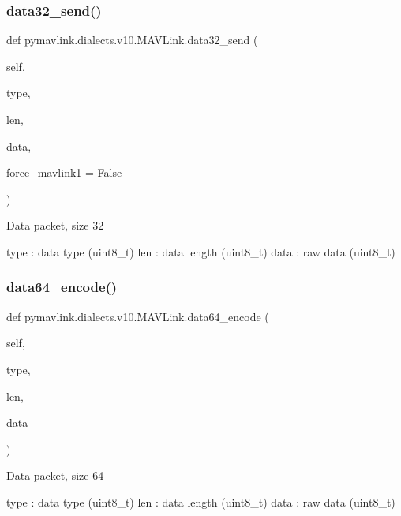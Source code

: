\begin{DoxyVerb}
\begin{DoxyVerb}
\subsubsection{\texorpdfstring{data32\+\_\+send()}{data32\_send()}}
{\footnotesize\ttfamily def pymavlink.\+dialects.\+v10.\+M\+A\+V\+Link.\+data32\+\_\+send (\begin{DoxyParamCaption}\item[{}]{self,  }\item[{}]{type,  }\item[{}]{len,  }\item[{}]{data,  }\item[{}]{force\+\_\+mavlink1 = {\ttfamily False} }\end{DoxyParamCaption})}

\begin{DoxyVerb}Data packet, size 32

type                      : data type (uint8_t)
len                       : data length (uint8_t)
data                      : raw data (uint8_t)\end{DoxyVerb}
 \mbox{\label{classpymavlink_1_1dialects_1_1v10_1_1MAVLink_af1b1f0c45e76cfac7874724483955849}} 
\subsubsection{\texorpdfstring{data64\+\_\+encode()}{data64\_encode()}}
{\footnotesize\ttfamily def pymavlink.\+dialects.\+v10.\+M\+A\+V\+Link.\+data64\+\_\+encode (\begin{DoxyParamCaption}\item[{}]{self,  }\item[{}]{type,  }\item[{}]{len,  }\item[{}]{data }\end{DoxyParamCaption})}

\begin{DoxyVerb}Data packet, size 64

type                      : data type (uint8_t)
len                       : data length (uint8_t)
data                      : raw data (uint8_t)\end{DoxyVerb}
 \mbox{\label{classpymavlink_1_1dialects_1_1v10_1_1MAVLink_a7d7f6ce72d5a0acf702814721908ba91}} 

\end{DoxyVerb}
\end{DoxyVerb}
